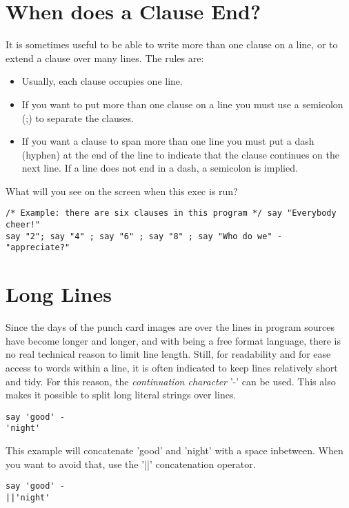 {\section{When does a Clause End?}
It is sometimes useful to be able to write more than one clause on a
line, or to extend a clause over many lines. The rules are:
\begin{itemize}
\item Usually, each clause occupies one line.
\item If you want to put more than one clause on a line you must use a semicolon (;) to separate the clauses.
\item If you want a clause to span more than one line you must put a
  dash (hyphen) at the end of the line to indicate that the clause
  continues on the next line. If a line does not end in a dash, a
  semicolon is implied.
\end{itemize}
What will you see on the screen when this exec is run?
\begin{lstlisting}[label=rah,caption=RAH Exec]
/* Example: there are six clauses in this program */ say "Everybody cheer!"
say "2"; say "4" ; say "6" ; say "8" ; say "Who do we" -
"appreciate?"
\end{lstlisting}
\section{Long Lines}
Since the days of the punch card images are over the lines in program
sources have become longer and longer, and with \nr{} being a free
format language, there is no real technical reason to limit line
length. Still, for readability and for ease access to words within a
line, it is often indicated to keep lines relatively short and
tidy. For this reason, the \emph{continuation character} '-' can be
used. This also makes it possible to split long literal strings over
lines.
\begin{lstlisting}[label=longline,caption=Long lines]
say 'good' - 
'night'
\end{lstlisting}
This example will concatenate 'good' and 'night' with a space
inbetween. When you want to avoid that, use the '||' concatenation
operator.
\begin{lstlisting}[label=longlineconcat,caption=Long lines with string
  concatenation without space]
say 'good' - 
||'night'
\end{lstlisting}

}

